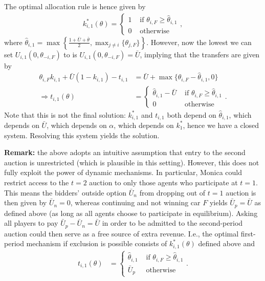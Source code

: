 \documentclass[a4paper]{article}
\begin{document}
\begin{enumerate}
	The optimal allocation rule is hence given by
	\begin{align*}
		k_{i,1}^*(\theta) = \begin{cases}
			1 & \text{ if } \theta_{i,F} \geq \hat{\theta}_{i,1}
			\\
			0 & \text{ otherwise}
		\end{cases},
	\end{align*}
	where $\hat{\theta}_{i,1} = \max \left\{\frac{1+\bar{U}+\bar{\theta}}{2}, \max_{j \neq i} \{ \theta_{j,F} \} \right\}$.
	However, now the lowest we can set $U_{i,1}(0,\theta_{-i,F})$ to is $U_{i,1}(0,\theta_{-i,F}) = \bar{U}$, implying that the transfers are given by
	\begin{align*}
		\theta_{i,F} k_{i,1} + \bar{U}(1-k_{i,1}) - t_{i,1} &= \bar{U} + \max \{ \theta_{i,F} - \hat{\theta}_{i,1}, 0 \}
		\\
		\Rightarrow t_{i,1}(\theta) &= \begin{cases}
			\hat{\theta}_{i,1} - \bar{U} & \text{ if } \theta_{i,F} \geq \hat{\theta}_{i,1}
			\\
			0 & \text{ otherwise}
		\end{cases}.
	\end{align*}
	Note that this is not the final solution: $k^*_{i,1}$ and $t_{i,1}$ both depend on $\hat{\theta}_{i,1}$, which depends on $\bar{U}$, which depends on $\alpha$, which depends on $k^*_1$, hence we have a closed system. Resolving this system yields the solution.
	
	\textbf{Remark:} the above adopts an intuitive assumption that entry to the second auction is unrestricted (which is plausible in this setting). However, this does not fully exploit the power of dynamic mechanisms. In particular, Monica could restrict access to the $t=2$ auction to only those agents who participate at $t=1$. This means the bidders' outside option $\bar{U}_n$ from dropping out of $t=1$ auction is then given by $\bar{U}_n = 0$, whereas continuing and not winning car $F$ yields $\bar{U}_p = \bar{U}$ as defined above (as long as all agents choose to participate in equilibrium). Asking all players to pay $\bar{U}_p - \bar{U}_n = \bar{U}$ in order to be admitted to the second-period auction could then serve as a free source of extra revenue. I.e., the optimal first-period mechanism if exclusion is possible consists of $k^*_{i,1}(\theta)$ defined above and 
	\begin{align*}
		t_{i,1}(\theta) &= \begin{cases}
			\hat{\theta}_{i,1} & \text{ if } \theta_{i,F} \geq \hat{\theta}_{i,1}
			\\
			\bar{U}_p & \text{ otherwise}
		\end{cases}.
	\end{align*}
	


\end{enumerate}
\end{document}
